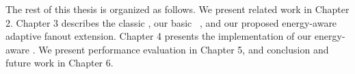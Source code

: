 The rest of this thesis is organized as follows. We present related work in Chapter 2. Chapter 3 describes the classic \gp, our basic \pp ~\gp, and our proposed energy-aware adaptive fanout extension. Chapter 4 presents the implementation of our energy-aware \gp. We present performance evaluation in Chapter 5, and conclusion and future work in Chapter 6.




